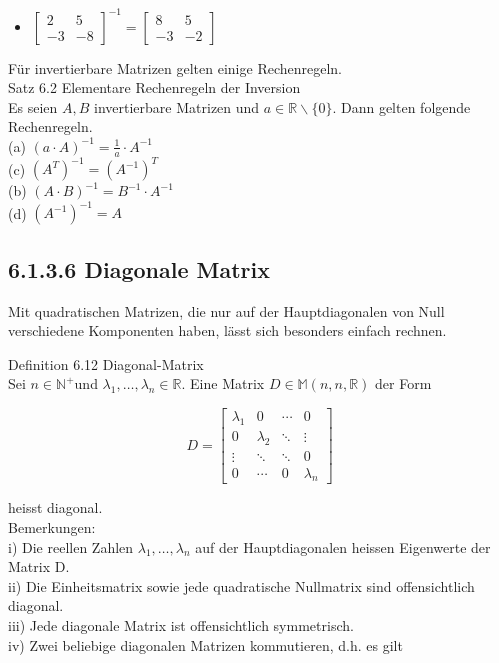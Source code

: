 \documentclass[10pt]{article}
\begin{document}
\begin{itemize}
  \item $\left[\begin{array}{rr}2 & 5 \\ -3 & -8\end{array}\right]^{-1}=\left[\begin{array}{rr}8 & 5 \\ -3 & -2\end{array}\right]$
\end{itemize}

Für invertierbare Matrizen gelten einige Rechenregeln.\\
Satz 6.2 Elementare Rechenregeln der Inversion\\
Es seien $A, B$ invertierbare Matrizen und $a \in \mathbb{R} \backslash\{0\}$. Dann gelten folgende Rechenregeln.\\
(a) $(a \cdot A)^{-1}=\frac{1}{a} \cdot A^{-1}$\\
(c) $\left(A^{T}\right)^{-1}=\left(A^{-1}\right)^{T}$\\
(b) $(A \cdot B)^{-1}=B^{-1} \cdot A^{-1}$\\
(d) $\left(A^{-1}\right)^{-1}=A$

\subsection*{6.1.3.6 Diagonale Matrix}
Mit quadratischen Matrizen, die nur auf der Hauptdiagonalen von Null verschiedene Komponenten haben, lässt sich besonders einfach rechnen.

Definition 6.12 Diagonal-Matrix\\
Sei $n \in \mathbb{N}^{+}$und $\lambda_{1}, \ldots, \lambda_{n} \in \mathbb{R}$. Eine Matrix $D \in \mathbb{M}(n, n, \mathbb{R})$ der Form

\[
D=\left[\begin{array}{cccc}
\lambda_{1} & 0 & \cdots & 0  \tag{6.29}\\
0 & \lambda_{2} & \ddots & \vdots \\
\vdots & \ddots & \ddots & 0 \\
0 & \cdots & 0 & \lambda_{n}
\end{array}\right]
\]

heisst diagonal.\\
Bemerkungen:\\
i) Die reellen Zahlen $\lambda_{1}, \ldots, \lambda_{n}$ auf der Hauptdiagonalen heissen Eigenwerte der Matrix D.\\
ii) Die Einheitsmatrix sowie jede quadratische Nullmatrix sind offensichtlich diagonal.\\
iii) Jede diagonale Matrix ist offensichtlich symmetrisch.\\
iv) Zwei beliebige diagonalen Matrizen kommutieren, d.h. es gilt
\end{document}
